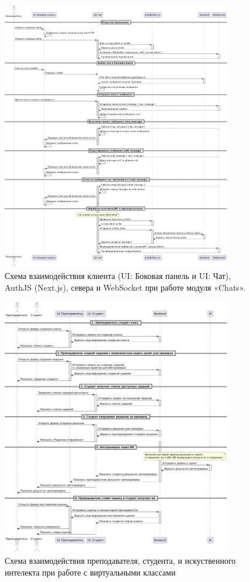 \begin{figure}[h]
    \centering
    \includegraphics[width=0.9\textwidth]{static/diagrams/Chats.png}
    \caption{Схема взаимодействия клиента (UI: Боковая панель и UI: Чат), AuthJS (Next.js), севера и WebSocket при работе модуля «Chats».}
    \label{fig:chats-flow}
\end{figure}


\begin{figure}[h]
    \centering
    \includegraphics[width=0.9\textwidth]{static/diagrams/Classroom.png}
    \caption{Схема взаимодействия преподавателя, студента, и искуственного интелекта при работе с виртуальными классами}
    \label{fig:classroom-flow}
\end{figure}

